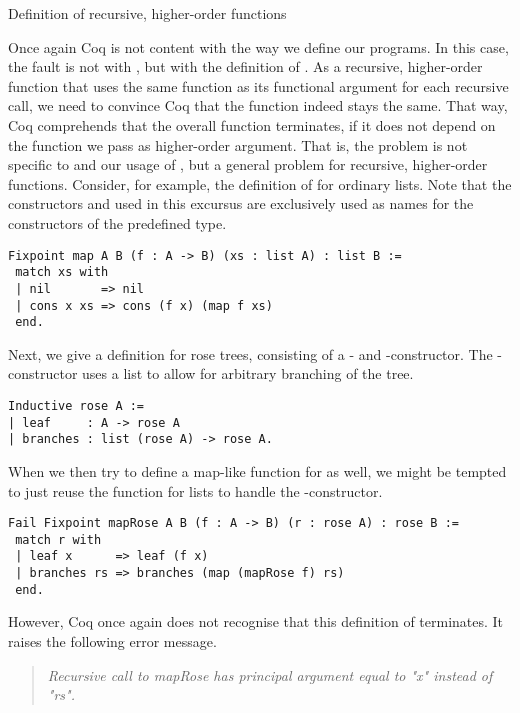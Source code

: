 \begin{excursus}{Definition of recursive, higher\--order functions}

Once again Coq is not content with the way we define our programs.
In this case, the fault is not with , but with the definition of .
As a recursive, higher\--order function that uses the same function as its functional argument for each recursive call, we need to convince Coq that the function indeed stays the same.
That way, Coq comprehends that the overall function terminates, if it does not depend on the function we pass as higher\--order argument.
That is, the problem is not specific to  and our usage of , but a general problem for recursive, higher\--order functions.
Consider, for example, the definition of  for ordinary lists.
Note that the constructors  and  used in this excursus are exclusively used as names for the constructors of the predefined  type.

\begin{verbatim}
Fixpoint map A B (f : A -> B) (xs : list A) : list B :=
 match xs with
 | nil       => nil
 | cons x xs => cons (f x) (map f xs)
 end.
\end{verbatim}

Next, we give a definition for rose trees, consisting of a \-- and \--constructor.
The \--constructor uses a list to allow for arbitrary branching of the tree.

\begin{verbatim}
Inductive rose A :=
| leaf     : A -> rose A
| branches : list (rose A) -> rose A.
\end{verbatim}

When we then try to define a map\--like function for  as well, we might be tempted to just reuse the  function for lists to handle the \--constructor.

\begin{verbatim}
Fail Fixpoint mapRose A B (f : A -> B) (r : rose A) : rose B :=
 match r with
 | leaf x      => leaf (f x)
 | branches rs => branches (map (mapRose f) rs)
 end.
\end{verbatim}

However, Coq once again does not recognise that this definition of  terminates.
It raises the following error message.

\begin{quote}
\emph{Recursive call to mapRose has principal argument equal to "x" instead of "rs".}
\end{quote}


\end{excursus}
